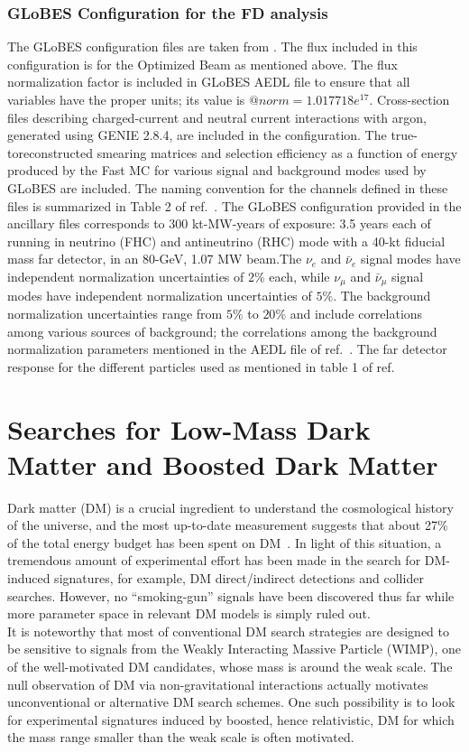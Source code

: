  \subsubsection{GLoBES Configuration for the FD analysis}
The GLoBES configuration files are taken from \cite{Alion:2016uaj}.  The flux included in this configuration is for the Optimized Beam as mentioned above. The flux normalization factor is included in GLoBES AEDL file to ensure that all variables have the proper units; its value is $@norm = 1.017718e^{17}$. Cross-section files describing charged-current and neutral current interactions with argon, generated using GENIE 2.8.4, are included in the configuration. The true-toreconstructed
smearing matrices and selection efficiency as a function of energy produced by the Fast MC for various signal and background modes used by GLoBES are included. The naming convention for the channels defined in these files is summarized in Table 2 of ref.~\cite{Alion:2016uaj}. The GLoBES configuration provided in the ancillary files corresponds to 300 kt-MW-years of exposure: 3.5 years each of running in neutrino (FHC) and antineutrino (RHC) mode with a 40-kt fiducial mass far detector, in an 80-GeV, 1.07 MW beam.The $\nu_{e}$ and $\bar\nu_{e}$ signal  modes have independent normalization uncertainties of $2\%$ each, while $\nu_{\mu}$ and $\bar{\nu}_{\mu}$ signal modes have independent normalization uncertainties of $5\%$. The background normalization uncertainties range from $5\%$ to $20\%$ and include
correlations among various sources of background; the correlations among the background normalization
parameters mentioned in the AEDL file of ref.~\cite{Alion:2016uaj}. The far detector response for the different particles used as mentioned in table 1 of ref\cite{Alion:2016uaj}.
\newpage
\section{Searches for Low-Mass  Dark Matter and Boosted Dark Matter}
Dark matter (DM) is a crucial ingredient to understand the cosmological history of the universe, and the most up-to-date measurement suggests that about 27\% of the total energy budget has been spent on DM~\cite{Aghanim:2018eyx}. In light of this situation, a tremendous amount of experimental effort has been made in the search for DM-induced signatures, for example, DM direct/indirect detections and collider searches. However, no ``smoking-gun'' signals have been discovered thus far while more parameter space in relevant DM models is simply ruled out.\\ 
It is noteworthy that most of conventional DM search strategies are designed to be sensitive to signals from the Weakly Interacting Massive Particle (WIMP), one of the well-motivated DM candidates, whose mass is around the weak scale. 
The null observation of DM via non-gravitational interactions actually motivates unconventional or alternative DM search schemes. 
One such possibility is to look for experimental signatures induced by boosted, hence relativistic, DM for which the mass range smaller than the weak scale is often motivated. 

